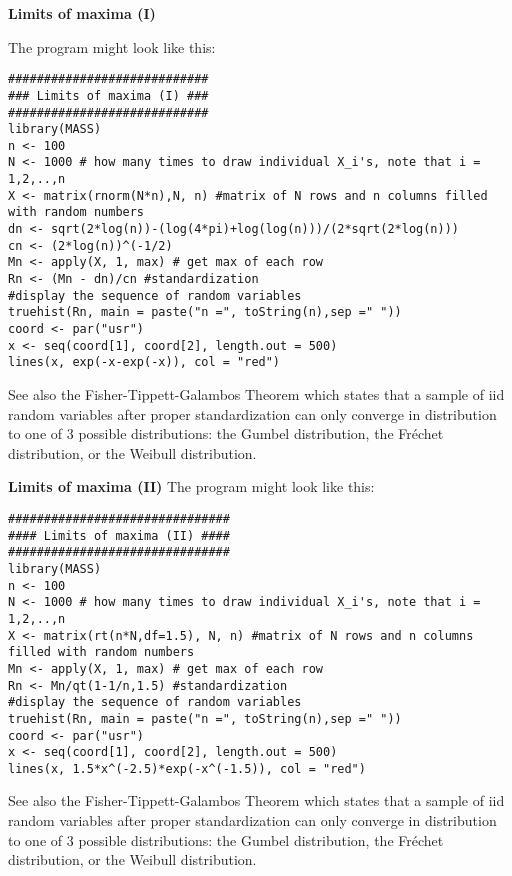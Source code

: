 \begin{Solution}{9.6}
\textbf{Limits of maxima (I)}

The program might look like this:
\begin{verbatim}
############################
### Limits of maxima (I) ###
############################
library(MASS)
n <- 100
N <- 1000 # how many times to draw individual X_i's, note that i = 1,2,..,n
X <- matrix(rnorm(N*n),N, n) #matrix of N rows and n columns filled with random numbers
dn <- sqrt(2*log(n))-(log(4*pi)+log(log(n)))/(2*sqrt(2*log(n)))
cn <- (2*log(n))^(-1/2)
Mn <- apply(X, 1, max) # get max of each row
Rn <- (Mn - dn)/cn #standardization
#display the sequence of random variables
truehist(Rn, main = paste("n =", toString(n),sep =" "))
coord <- par("usr")
x <- seq(coord[1], coord[2], length.out = 500)
lines(x, exp(-x-exp(-x)), col = "red")
\end{verbatim}
See also the Fisher-Tippett-Galambos Theorem which states that a sample of iid random variables after proper standardization can only converge in distribution to one of 3 possible distributions: the Gumbel distribution, the Fréchet distribution, or the Weibull distribution.
\end{Solution}
\begin{Solution}{9.7}
\textbf{Limits of maxima (II)}
The program might look like this:
\begin{verbatim}
###############################
#### Limits of maxima (II) ####
###############################
library(MASS)
n <- 100
N <- 1000 # how many times to draw individual X_i's, note that i = 1,2,..,n
X <- matrix(rt(n*N,df=1.5), N, n) #matrix of N rows and n columns filled with random numbers
Mn <- apply(X, 1, max) # get max of each row
Rn <- Mn/qt(1-1/n,1.5) #standardization
#display the sequence of random variables
truehist(Rn, main = paste("n =", toString(n),sep =" "))
coord <- par("usr")
x <- seq(coord[1], coord[2], length.out = 500)
lines(x, 1.5*x^(-2.5)*exp(-x^(-1.5)), col = "red")
\end{verbatim}
See also the Fisher-Tippett-Galambos Theorem which states that a sample of iid random variables after proper standardization can only converge in distribution to one of 3 possible distributions: the Gumbel distribution, the Fréchet distribution, or the Weibull distribution.
\end{Solution}
